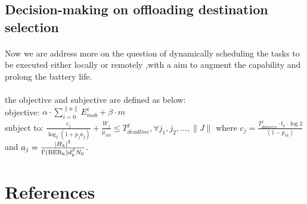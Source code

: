 \documentclass[review]{elsarticle}
\begin{document}
    \subsection{Decision-making on offloading destination selection }
    \paragraph{}
    Now we are address more on the question of dynamically scheduling the tasks to be executed either locally or remotely ,with a aim to augment the capability and prolong the battery life.
    \paragraph{}
    the objective and subjective are defined as below:\\
    objective:  $\alpha \cdot\sum_{i=0}^{\parallel n\parallel}E_{mob}^i + \beta \cdot m$ \\
    subject to: $ \frac{c_{j}}{\log_{2}{(1+p_{j}a_{j})}} +\frac{W_{j}}{\mu_{cld}} \leq T_{deadline}^{j} , \forall j_{1},j_{2},...,\parallel J\parallel$
    where $c_{j} =\frac{T_{datasize}^j \cdot t_b\cdot \log2}{(1-p_{ek})}  $ and $ a_j=\frac{  \vert H_{k}\vert ^{2}}{\Gamma({\rm BER}_{{\rm k}})d_{k}^{\beta}N_{0}} $.
 
\section*{References}


\end{document}
